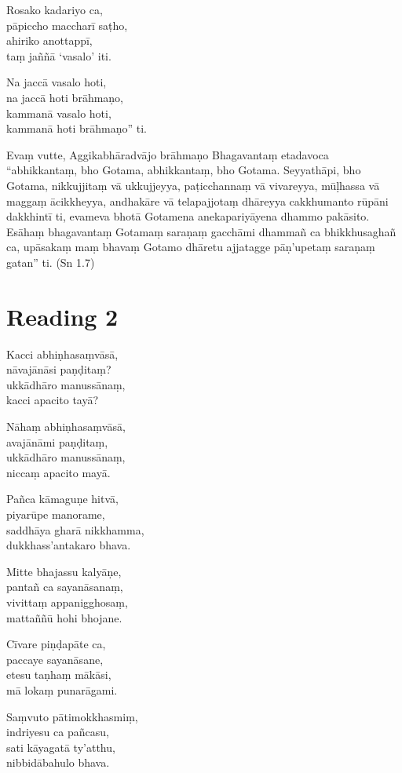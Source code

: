 Rosako kadariyo ca,\\
pāpiccho maccharī saṭho,\\
ahiriko anottappī,\\
taṃ jaññā ‘vasalo’ iti.

Na jaccā vasalo hoti,\\
na jaccā hoti brāhmaṇo,\\
kammanā vasalo hoti,\\
kammanā hoti brāhmaṇo” ti.

Evaṃ vutte, Aggikabhāradvājo brāhmaṇo Bhagavantaṃ etadavoca “abhikkantaṃ, bho Gotama, abhikkantaṃ, bho Gotama. Seyyathāpi, bho Gotama, nikkujjitaṃ vā ukkujjeyya, paṭicchannaṃ vā vivareyya, mūḷhassa vā maggaṃ ācikkheyya, andhakāre vā telapajjotaṃ dhāreyya cakkhumanto rūpāni dakkhintī ti, evameva bhotā Gotamena anekapariyāyena dhammo pakāsito. Esāhaṃ bhagavantaṃ Gotamaṃ saraṇaṃ gacchāmi dhammañ ca bhikkhusaghañ ca, upāsakaṃ maṃ bhavaṃ Gotamo dhāretu ajjatagge pāṇ’upetaṃ saraṇaṃ gatan” ti. (Sn 1.7)

\section*{Reading 2}

Kacci abhiṇhasaṃvāsā,\\
nāvajānāsi paṇḍitaṃ?\\
ukkādhāro manussānaṃ,\\
kacci apacito tayā?

Nāhaṃ abhiṇhasaṃvāsā,\\
avajānāmi paṇḍitaṃ,\\
ukkādhāro manussānaṃ,\\
niccaṃ apacito mayā.

Pañca kāmaguṇe hitvā,\\
piyarūpe manorame,\\
saddhāya gharā nikkhamma,\\
dukkhass’antakaro bhava.

Mitte bhajassu kalyāṇe,\\
pantañ ca sayanāsanaṃ,\\
vivittaṃ appanigghosaṃ,\\
mattaññū hohi bhojane.

Cīvare piṇḍapāte ca,\\
paccaye sayanāsane,\\
etesu taṇhaṃ mākāsi,\\
mā lokaṃ punarāgami.

Saṃvuto pātimokkhasmiṃ,\\
indriyesu ca pañcasu,\\
sati kāyagatā ty’atthu,\\
nibbidābahulo bhava.

